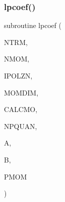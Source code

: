 \subsubsection{\texorpdfstring{lpcoef()}{lpcoef()}}
{\footnotesize\ttfamily subroutine lpcoef (\begin{DoxyParamCaption}\item[{integer}]{N\+T\+RM,  }\item[{integer}]{N\+M\+OM,  }\item[{integer}]{I\+P\+O\+L\+ZN,  }\item[{integer}]{M\+O\+M\+D\+IM,  }\item[{logical, dimension( $\ast$ )}]{C\+A\+L\+C\+MO,  }\item[{integer}]{N\+P\+Q\+U\+AN,  }\item[{complex, dimension( $\ast$ )}]{A,  }\item[{complex, dimension( $\ast$ )}]{B,  }\item[{real, dimension( 0\+:momdim, $\ast$ )}]{P\+M\+OM }\end{DoxyParamCaption})}

\mbox{\label{wiscombe__miev__1_2_m_i_e_v0_8f_a48092e733ab76cc9db0501ed3b28d9ff}} 
